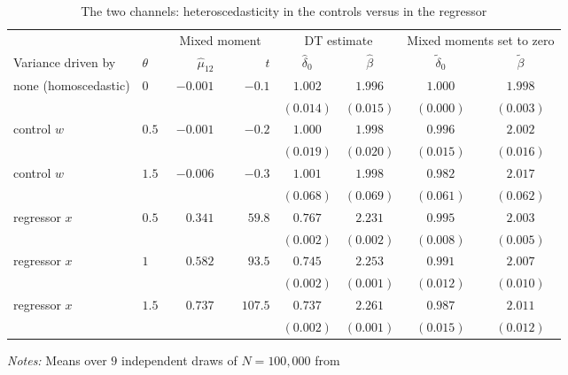 \begin{table}[!h]
\centering
\caption{The two channels: heteroscedasticity in the controls versus in the regressor}
\label{tab:het_channels}
\begin{threeparttable}
\begin{tabular}{llrrcccc}
\toprule
& & \multicolumn{2}{c}{Mixed moment}
& \multicolumn{2}{c}{DT estimate}
& \multicolumn{2}{c}{Mixed moments set to zero} \\
\cmidrule(lr){3-4}\cmidrule(lr){5-6}\cmidrule(lr){7-8}
Variance driven by & \(\theta\)
& \(\widehat\mu_{12}\) & \(t\)
& \(\widehat\delta_0\) & \(\widehat\beta\)
& \(\widetilde\delta_0\) & \(\widetilde\beta\) \\
\midrule
none (homoscedastic) & \(0\) & \(-0.001\) & \(-0.1\)
  & \(1.002\) & \(1.996\) & \(1.000\) & \(1.998\) \\
  & & & & \((0.014)\) & \((0.015)\) & \((0.000)\) & \((0.003)\) \\
\midrule
control \(w\) & \(0.5\) & \(-0.001\) & \(-0.2\)
  & \(1.000\) & \(1.998\) & \(0.996\) & \(2.002\) \\
  & & & & \((0.019)\) & \((0.020)\) & \((0.015)\) & \((0.016)\) \\
control \(w\) & \(1.5\) & \(-0.006\) & \(-0.3\)
  & \(1.001\) & \(1.998\) & \(0.982\) & \(2.017\) \\
  & & & & \((0.068)\) & \((0.069)\) & \((0.061)\) & \((0.062)\) \\
\midrule
regressor \(x\) & \(0.5\) & \(\phantom{-}0.341\) & \(\phantom{-}59.8\)
  & \(0.767\) & \(2.231\) & \(0.995\) & \(2.003\) \\
  & & & & \((0.002)\) & \((0.002)\) & \((0.008)\) & \((0.005)\) \\
regressor \(x\) & \(1\) & \(\phantom{-}0.582\) & \(\phantom{-}93.5\)
  & \(0.745\) & \(2.253\) & \(0.991\) & \(2.007\) \\
  & & & & \((0.002)\) & \((0.001)\) & \((0.012)\) & \((0.010)\) \\
regressor \(x\) & \(1.5\) & \(\phantom{-}0.737\) & \(\phantom{-}107.5\)
  & \(0.737\) & \(2.261\) & \(0.987\) & \(2.011\) \\
  & & & & \((0.002)\) & \((0.001)\) & \((0.015)\) & \((0.012)\) \\
\bottomrule
\end{tabular}
\begin{tablenotes}
\small
\item \textit{Notes:} Means over \(9\) independent draws of \(N=100{,}000\) from

\end{tablenotes}
\end{threeparttable}
\end{table}
